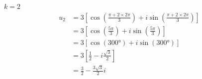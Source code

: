 \begin{resolution}{\(k=2\)}
\begin{align*}
  u_2
  & = 3 \left[
  \cos\left( \frac{\pi+2\times 2\pi}{3} \right)
  + i \sin\left( \frac{\pi+2\times 2\pi}{3} \right)
  \right] \\
  & = 3 \left[
  \cos\left( \frac{5\pi}{3} \right)
  + i \sin\left( \frac{5\pi}{3} \right)
  \right] \\
  & = 3 \left[
  \cos\left( \ang{300} \right)
  + i \sin\left( \ang{300} \right)
  \right] \\
  & = 3 \left[
  \frac{1}{2}
  - i \frac{\sqrt{3}}{2}
  \right] \\
  & = \frac{3}{2} - \frac{3\sqrt{3}}{2}i
\end{align*}
\end{resolution}

